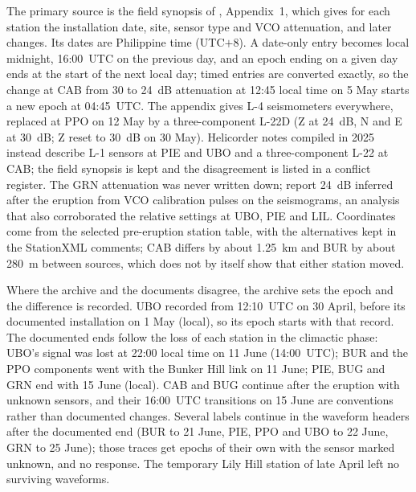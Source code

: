 \documentclass[11pt]{article}
\begin{document}
The primary source is the field synopsis of \citet{Lockhart_1996}, Appendix~1, which gives for each station the installation date, site, sensor type and VCO attenuation, and later changes. Its dates are Philippine time (UTC$+$8). A date-only entry becomes local midnight, 16:00~UTC on the previous day, and an epoch ending on a given day ends at the start of the next local day; timed entries are converted exactly, so the change at CAB from 30 to 24~dB attenuation at 12:45 local time on 5 May starts a new epoch at 04:45~UTC. The appendix gives L-4 seismometers everywhere, replaced at PPO on 12 May by a three-component L-22D (Z at 24~dB, N and E at 30~dB; Z reset to 30~dB on 30 May). Helicorder notes compiled in 2025 instead describe L-1 sensors at PIE and UBO and a three-component L-22 at CAB; the field synopsis is kept and the disagreement is listed in a conflict register. The GRN attenuation was never written down; \citet{Lockhart_1996} report 24~dB inferred after the eruption from VCO calibration pulses on the seismograms, an analysis that also corroborated the relative settings at UBO, PIE and LIL. Coordinates come from the selected pre-eruption station table, with the alternatives kept in the StationXML comments; CAB differs by about 1.25~km and BUR by about 280~m between sources, which does not by itself show that either station moved.

Where the archive and the documents disagree, the archive sets the epoch and the difference is recorded. UBO recorded from 12:10~UTC on 30 April, before its documented installation on 1 May (local), so its epoch starts with that record. The documented ends follow the loss of each station in the climactic phase: UBO's signal was lost at 22:00 local time on 11 June (14:00~UTC); BUR and the PPO components went with the Bunker Hill link on 11 June; PIE, BUG and GRN end with 15 June (local). CAB and BUG continue after the eruption with unknown sensors, and their 16:00~UTC transitions on 15 June are conventions rather than documented changes. Several labels continue in the waveform headers after the documented end (BUR to 21 June, PIE, PPO and UBO to 22 June, GRN to 25 June); those traces get epochs of their own with the sensor marked unknown, and no response. The temporary Lily Hill station of late April left no surviving waveforms.

\begin{table}[htbp]
\centering\scriptsize
\caption{Channel epochs beginning before 17 June 1991. Tilt channels have no seismic response. Gain is the nominal VCO amplifier gain (90~dB less the attenuation); sensitivity is the nominal count response at 5~Hz (Table~\ref{tab:stages}), also given as ground displacement per count at 5~Hz (the CSS3.0 \texttt{ncalib} at \texttt{ncalper} 0.2~s). Noise is the median peak-to-peak amplitude, in counts, of the first 5~s of up to 60 records in the first three days of the epoch, with the number of records; Lockhart's setting of 100~mV at the VCO input corresponds to 82 counts. Epochs without a documented sensor have no response.}\label{tab:responseepochs}

\end{table}
\end{document}

